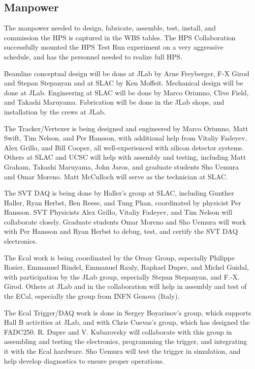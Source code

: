 \subsection{Manpower}

The manpower needed to design, fabricate, assemble, test, install, and commission the HPS is captured in the WBS tables. 
The HPS Collaboration successfully mounted the HPS Test Run experiment on a very aggressive schedule, and has the personnel needed to realize full HPS.

Beamline conceptual design will be done at JLab by Arne Freyberger, F-X Girod and Stepan Stepanyan and at SLAC by Ken Moffeit. 
Mechanical design will be done at JLab.
Engineering at SLAC will be done by Marco Oriunno, Clive Field, and Takashi Maruyama. Fabrication will be done in the 
JLab shops, and installation by the crews at JLab. 

The Tracker/Vertexer is being designed and engineered by Marco Oriunno, Matt Swift, Tim Nelson, and Per Hansson, with additional help 
from Vitaliy Fadeyev, Alex Grillo, and Bill Cooper, all well-experienced with silicon detector systems. Others at SLAC and UCSC will 
help with assembly and testing, including Matt Graham, Takashi Maruyama, John Jaros, and 
graduate students Sho Uemura and Omar Moreno. Matt McCulloch will serve as the technician at SLAC.

The SVT DAQ is being done by Haller's group at SLAC, including Gunther Haller, Ryan 
Herbst, Ben Reese, and Tung Phan, coordinated by physicist Per Hansson. SVT Physicists Alex Grillo, Vitaliy Fadeyev, and Tim Nelson will collaborate closely. 
Graduate students Omar Moreno and Sho Uemura will work with Per Hansson and Ryan Herbst to debug, test, and certify the SVT DAQ electronics.

The Ecal work is being coordinated by the Orsay Group, especially Philippe Rosier, Emmanuel Rindel, Emmanuel Rauly, Raphael Dupre, and Michel Guidal, 
with participation by the JLab group, especially Stepan Stepanyan, and F.-X. Girod.  Others at JLab and in the collaboration will help in 
assembly and test of the ECal, especially the group from INFN Genova (Italy).

The Ecal Trigger/DAQ work is done in Sergey Boyarinov's group, which supports Hall B activities at JLab, and with Chris Cuevas's group, which has designed the FADC250.
R. Dupre and  V. Kubarovsky will collaborate with this group in assembling and testing the electronics, programming the trigger, and integrating it with 
the Ecal hardware. Sho Uemura will test the trigger in simulation, and help develop diagnostics to ensure proper operations.

